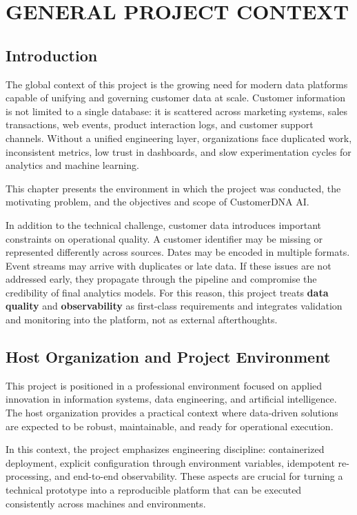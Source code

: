 \chapter{GENERAL PROJECT CONTEXT}

\section{Introduction}
The global context of this project is the growing need for modern data platforms capable of unifying and governing customer data at scale. Customer information is not limited to a single database: it is scattered across marketing systems, sales transactions, web events, product interaction logs, and customer support channels. Without a unified engineering layer, organizations face duplicated work, inconsistent metrics, low trust in dashboards, and slow experimentation cycles for analytics and machine learning.

This chapter presents the environment in which the project was conducted, the motivating problem, and the objectives and scope of CustomerDNA AI.

In addition to the technical challenge, customer data introduces important constraints on operational quality. A customer identifier may be missing or represented differently across sources. Dates may be encoded in multiple formats. Event streams may arrive with duplicates or late data. If these issues are not addressed early, they propagate through the pipeline and compromise the credibility of final analytics models. For this reason, this project treats \textbf{data quality} and \textbf{observability} as first-class requirements and integrates validation and monitoring into the platform, not as external afterthoughts.

\section{Host Organization and Project Environment}
This project is positioned in a professional environment focused on applied innovation in information systems, data engineering, and artificial intelligence. The host organization provides a practical context where data-driven solutions are expected to be robust, maintainable, and ready for operational execution.

In this context, the project emphasizes engineering discipline: containerized deployment, explicit configuration through environment variables, idempotent re-processing, and end-to-end observability. These aspects are crucial for turning a technical prototype into a reproducible platform that can be executed consistently across machines and environments.

